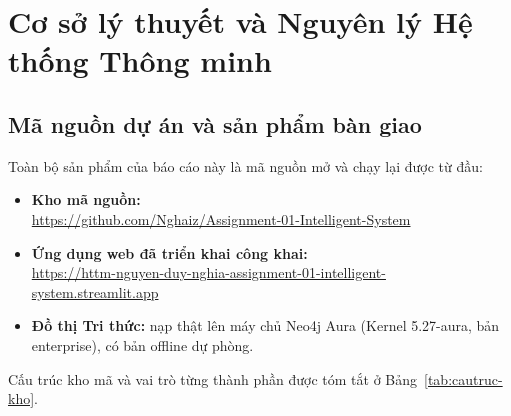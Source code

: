 \chapter{Cơ sở lý thuyết và Nguyên lý Hệ thống Thông minh}
\label{ch:coso}

\section{Mã nguồn dự án và sản phẩm bàn giao}
\label{sec:masource}

Toàn bộ sản phẩm của báo cáo này là mã nguồn mở và chạy lại được từ đầu:

\begin{itemize}
  \item \textbf{Kho mã nguồn:}\\
        \url{https://github.com/Nghaiz/Assignment-01-Intelligent-System}
  \item \textbf{Ứng dụng web đã triển khai công khai:}\\
        \url{https://httm-nguyen-duy-nghia-assignment-01-intelligent-system.streamlit.app}
  \item \textbf{Đồ thị Tri thức:} nạp thật lên máy chủ Neo4j Aura
        (Kernel 5.27-aura, bản enterprise), có bản offline dự phòng.
\end{itemize}

\noindent Cấu trúc kho mã và vai trò từng thành phần được tóm tắt ở
Bảng~\ref{tab:cautruc-kho}.

